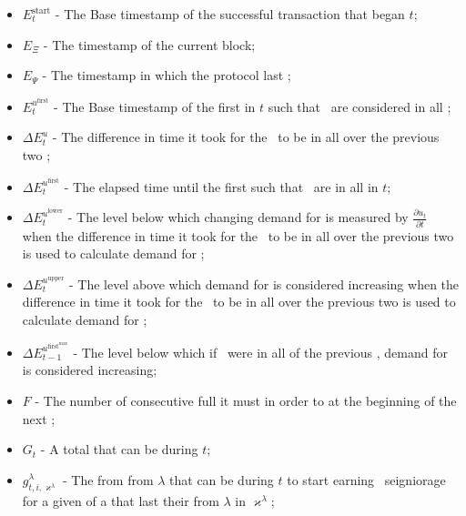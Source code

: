 \documentclass[class=article, crop=false]{standalone}
\begin{document}
\begin{itemize}[topsep=0pt, itemsep=2pt,leftmargin=16pt]
    \item[] $E_t^{\text{start}}$ - The Base timestamp of the successful  transaction that began $t$;
    \item[] $E_{\Xi}$ - The timestamp of the current block;
    \item[] $E_\Psi$ - The timestamp in which the protocol last ;
    \item[] $E_{t}^{u^{\text{first}}}$ - The Base timestamp of the first  in $t$ such that \Pinto\ are considered  in all ;
    \item[] $\Delta E_{t}^{u}$ - The difference in time it took for the \Pinto\ to be  in all  over the previous two ;
    \item[] $\Delta E_{t}^{u^{\text{first}}}$ - The elapsed time until the first  such that \Pinto\ are  in all  in  $t$;
    \item[] $\Delta E_{t}^{u^{\text{lower}}}$ - The level below which changing demand for  is measured by $\frac{\partial u_{t}}{\partial t}$ when the difference in time it took for the \Pinto\ to be  in all  over the previous two  is used to calculate demand for ;
    \item[] $\Delta E_{t}^{u^{\text{upper}}}$ - The level above which demand for  is considered increasing when the difference in time it took for the \Pinto\ to be  in all  over the previous two  is used to calculate demand for ;
    \item[] $\Delta E_{t-1}^{u^{\text{first}^{\text{max}}}}$ - The level below which if \Pinto\ were  in all  of the previous , demand for  is considered increasing;
    \item[] $F$ - The number of consecutive full  it must  in order to  at the beginning of the next ;
    \item[] $G_{t}$ - A  total  that can be  during $t$;
    \item[] $g_{t,i,\varkappa^{\lambda}}^{\lambda}$ - The  from  from $\lambda$  that can be  during $t$ to start earning \Pinto\ seigniorage for a given  of a  that last  their  from $\lambda$  in $\varkappa^{\lambda}$;

\end{itemize}
\end{document}
